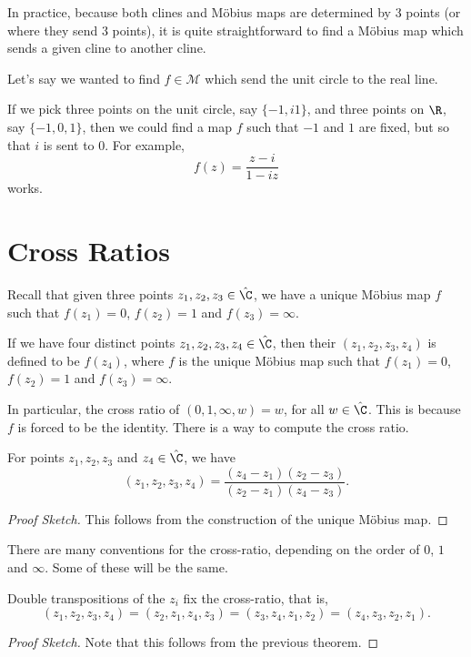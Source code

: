 \documentclass[a4]{scrreprt}
\newcommand{\newsection}{\section}
\begin{document}
In practice, because both clines and Möbius maps are determined by 3 points (or where they send 3 points), it is quite straightforward to find a Möbius map which sends a given cline to another cline.

\begin{example}
	Let's say we wanted to find $f \in \mathcal{M}$ which send the unit circle to the real line.

	If we pick three points on the unit circle, say $\{-1, i 1\}$, and three points on $\R$, say $\{-1, 0, 1\}$, then we could find a map $f$ such that $-1$ and $1$ are fixed, but so that $i$ is sent to $0$. For example,
	$$
	f(z) = \frac{z - i}{1 - iz}
	$$
	works.
\end{example}

\newsection{Cross Ratios}

Recall that given three points $z_1, z_2, z_3 \in \hat{\C}$, we have a unique Möbius map $f$ such that $f(z_1) = 0$, $f(z_2) = 1$ and $f(z_3) = \infty$.

\begin{definition}
	If we have four distinct points $z_1, z_2, z_3, z_4 \in \hat{\C}$, then their  $(z_1, z_2, z_3, z_4)$ is defined to be $f(z_4)$, where $f$ is the unique Möbius map such that $f(z_1) = 0$, $f(z_2) = 1$ and $f(z_3) = \infty$.
\end{definition}

In particular, the cross ratio of $(0, 1, \infty, w) = w$, for all $w \in \hat{\C}$. This is because $f$ is forced to be the identity. There is a way to compute the cross ratio.

\begin{theorem}
For points $z_1, z_2, z_3$ and $z_4 \in \hat{\C}$, we have
$$
(z_1, z_2 , z_3, z_4) = \frac{(z_4 - z_1)(z_2 - z_3)}{(z_2 - z_1)(z_4 - z_3)}.
$$
\end{theorem}
\begin{proof}[Proof Sketch]
This follows from the construction of the unique Möbius map.
\end{proof}

\begin{remark}
	There are many conventions for the cross-ratio, depending on the order of $0$, $1$ and $\infty$. Some of these will be the same.
\end{remark}

\begin{proposition}
	Double transpositions of the $z_i$ fix the cross-ratio, that is,
	$$
	(z_1, z_2, z_3, z_4) = (z_2, z_1, z_4, z_3) = (z_3, z_4, z_1, z_2) = (z_4, z_3, z_2, z_1).
	$$
\end{proposition}
\begin{proof}[Proof Sketch]
	Note that this follows from the previous theorem.
\end{proof}
\end{document}
